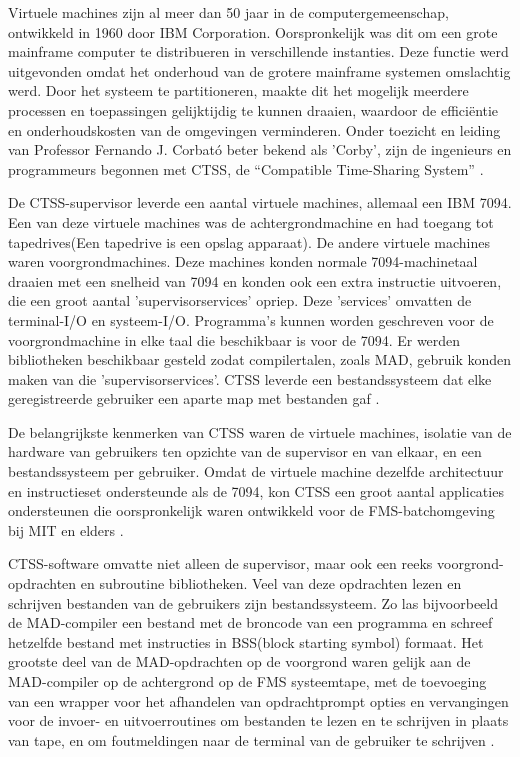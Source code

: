 Virtuele machines zijn al meer dan 50 jaar in de computergemeenschap, ontwikkeld in 1960 door IBM Corporation. Oorspronkelijk was dit om een grote mainframe computer te distribueren in verschillende instanties. Deze functie werd uitgevonden omdat het onderhoud van de grotere mainframe systemen omslachtig werd. Door het systeem te partitioneren, maakte dit het mogelijk meerdere processen en toepassingen gelijktijdig te kunnen draaien, waardoor de efficiëntie en onderhoudskosten van de omgevingen verminderen. Onder toezicht en leiding van Professor Fernando J. Corbató beter bekend als 'Corby', zijn de ingenieurs en programmeurs begonnen met CTSS, de “Compatible Time-Sharing System” \autocite{Ameen2013}.

De CTSS-supervisor leverde een aantal virtuele machines, allemaal een IBM 7094. Een van deze virtuele machines was de achtergrondmachine en had toegang tot tapedrives(Een tapedrive is een opslag apparaat). De andere virtuele machines waren voorgrondmachines. Deze machines konden normale 7094-machinetaal draaien met een snelheid van 7094 en konden ook een extra instructie uitvoeren, die een groot aantal 'supervisorservices' opriep. Deze 'services' omvatten de terminal-I/O en systeem-I/O. Programma's kunnen worden geschreven voor de voorgrondmachine in elke taal die beschikbaar is voor de 7094. Er werden bibliotheken beschikbaar gesteld zodat compilertalen, zoals MAD, gebruik konden maken van die 'supervisorservices'. CTSS leverde een bestandssysteem dat elke geregistreerde gebruiker een aparte map met bestanden gaf \autocite{VanVleck2015}.

De belangrijkste kenmerken van CTSS waren de virtuele machines, isolatie van de hardware van gebruikers ten opzichte van de supervisor en van elkaar, en een bestandssysteem per gebruiker. Omdat de virtuele machine dezelfde architectuur en instructieset ondersteunde als de 7094, kon CTSS een groot aantal applicaties ondersteunen die oorspronkelijk waren ontwikkeld voor de FMS-batchomgeving bij MIT en elders \autocite{VanVleck2015}.

CTSS-software omvatte niet alleen de supervisor, maar ook een reeks voorgrond-opdrachten en subroutine bibliotheken. Veel van deze opdrachten lezen en schrijven bestanden van de gebruikers zijn bestandssysteem. Zo las bijvoorbeeld de MAD-compiler een bestand met de broncode van een programma en schreef hetzelfde bestand met instructies in BSS(block starting symbol) formaat. Het grootste deel van de MAD-opdrachten op de voorgrond waren gelijk aan de MAD-compiler op de achtergrond op de FMS systeemtape, met de toevoeging van een wrapper voor het afhandelen van opdrachtprompt opties en vervangingen voor de invoer- en uitvoerroutines om bestanden te lezen en te schrijven in plaats van tape, en om foutmeldingen naar de terminal van de gebruiker te schrijven \autocite{VanVleck2015}.

